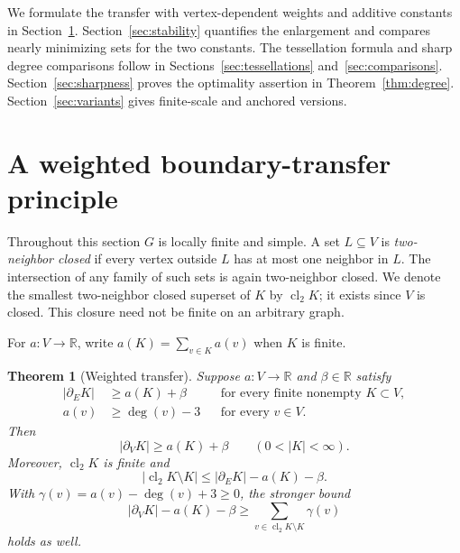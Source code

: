 \documentclass[11pt]{amsart}
\numberwithin{equation}{section}
\newtheorem{theorem}{Theorem}[section]
\theoremstyle{definition}
\theoremstyle{remark}
\newcommand{\bE}{\partial_E}
\newcommand{\bV}{\partial_V}
\newcommand{\cl}{\operatorname{cl}_2}
\newcommand{\R}{\mathbb R}
\begin{document}
We formulate the transfer with vertex-dependent weights and additive constants in Section~\ref{sec:transfer}. Section~\ref{sec:stability} quantifies the enlargement and compares nearly minimizing sets for the two constants. The tessellation formula and sharp degree comparisons follow in Sections~\ref{sec:tessellations} and~\ref{sec:comparisons}. Section~\ref{sec:sharpness} proves the optimality assertion in Theorem~\ref{thm:degree}. Section~\ref{sec:variants} gives finite-scale and anchored versions.

\section{A weighted boundary-transfer principle}\label{sec:transfer}
Throughout this section $G$ is locally finite and simple. A set $L\subseteq V$ is \emph{two-neighbor closed} if every vertex outside $L$ has at most one neighbor in $L$. The intersection of any family of such sets is again two-neighbor closed. We denote the smallest two-neighbor closed superset of $K$ by $\cl K$; it exists since $V$ is closed. This closure need not be finite on an arbitrary graph.

For $a:V\to\R$, write $a(K)=\sum_{v\in K}a(v)$ when $K$ is finite.

\begin{theorem}[Weighted transfer]\label{thm:weighted}
Suppose $a:V\to\R$ and $\beta\in\R$ satisfy
\begin{align}
|\bE K|&\ge a(K)+\beta
&&\text{for every finite nonempty }K\subset V,\label{eq:weighted-edge}\\
a(v)&\ge\deg(v)-3
&&\text{for every }v\in V.\label{eq:weighted-local}
\end{align}
Then
\begin{equation}\label{eq:weighted-vertex}
|\bV K|\ge a(K)+\beta
\qquad(0<|K|<\infty).
\end{equation}
Moreover, $\cl K$ is finite and
\begin{equation}\label{eq:weighted-time}
|\cl K\setminus K|\le |\bE K|-a(K)-\beta.
\end{equation}
With $\gamma(v)=a(v)-\deg(v)+3\ge0$, the stronger bound
\begin{equation}\label{eq:weighted-surplus}
|\bV K|-a(K)-\beta
\ge\sum_{v\in\cl K\setminus K}\gamma(v)
\end{equation}
holds as well.
\end{theorem}
\end{document}
